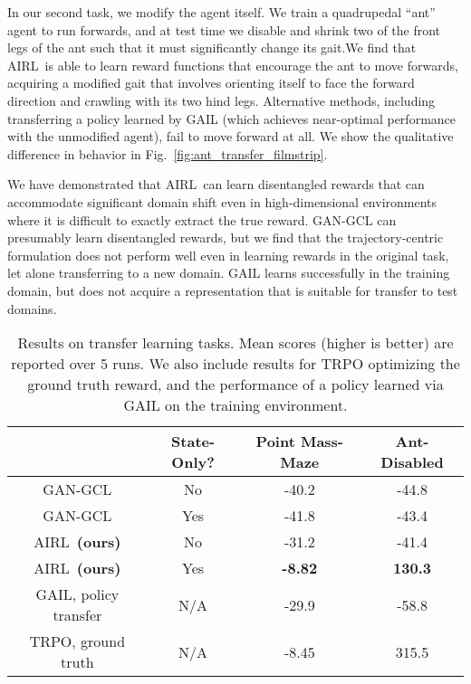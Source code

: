 \documentclass{article} \usepackage{iclr2018_conference,times}
\newcommand{\algnameabbrev}{AIRL}
\begin{document}
In our second task, we modify the agent itself. We train a quadrupedal ``ant'' agent to run forwards, and at test time we disable and shrink two of the front legs of the ant such that it must significantly change its gait.We find that \algnameabbrev\ is able to learn reward functions that encourage the ant to move forwards, acquiring a modified gait that involves orienting itself to face the forward direction and crawling with its two hind legs. Alternative methods, including transferring a policy learned by GAIL (which achieves near-optimal performance with the unmodified agent), fail to move forward at all. We show the qualitative difference in behavior in Fig.~\ref{fig:ant_transfer_filmstrip}.

We have demonstrated that \algnameabbrev\ can learn disentangled rewards that can accommodate significant domain shift even in high-dimensional environments where it is difficult to exactly extract the true reward. GAN-GCL can presumably learn disentangled rewards, but we find that the trajectory-centric formulation does not perform well even in learning rewards in the original task, let alone transferring to a new domain. GAIL learns successfully in the training domain, but does not acquire a representation that is suitable for transfer to test domains.


\begin{table}[H]
\caption{Results on transfer learning tasks. Mean scores (higher is better) are reported over 5 runs. We also include results for TRPO optimizing the ground truth reward, and the performance of a policy learned via GAIL on the training environment.}
\label{tbl:transfer_results}
\begin{center}
\begin{tabular}{c|c|cc}
\hline
& State-Only? & Point Mass-Maze & Ant-Disabled \\
\hline
GAN-GCL & No &  -40.2 &  -44.8\\
\hdashline
GAN-GCL & Yes & -41.8 & -43.4\\
\hdashline
\algnameabbrev\ \textbf{(ours)} & No &  -31.2 & -41.4\\
\hdashline
\algnameabbrev\ \textbf{(ours)} & Yes &  \textbf{-8.82} & \textbf{130.3}\\
\hline
GAIL, policy transfer & N/A &  -29.9 &  -58.8\\
\hdashline
TRPO, ground truth & N/A &  -8.45 &  315.5\\
\hline
\end{tabular}
\end{center}
\end{table}
\end{document}
